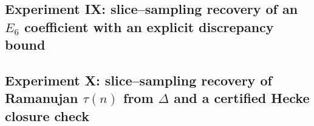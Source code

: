 \subsection{Experiment IX: slice--sampling recovery of an \texorpdfstring{$E_6$}{E6} coefficient with an explicit discrepancy bound}

\subsection{Experiment X: slice--sampling recovery of Ramanujan \texorpdfstring{$\tau(n)$}{tau(n)} from \texorpdfstring{$\Delta$}{Delta} and a certified Hecke closure check}


